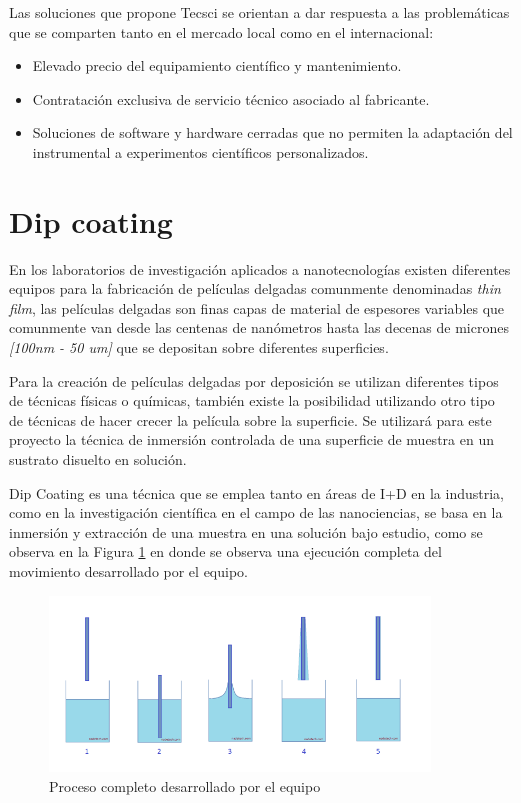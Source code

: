 Las soluciones que propone Tecsci se orientan a dar respuesta a las problemáticas que se comparten tanto en el mercado local como en el internacional:
\begin{itemize}
\item Elevado precio del equipamiento científico y mantenimiento.
\item Contratación exclusiva de servicio técnico asociado al fabricante.
\item Soluciones de software y hardware cerradas que no permiten la adaptación del instrumental a experimentos científicos personalizados.
\end{itemize}


\section{Dip coating}


En los laboratorios de investigación aplicados a nanotecnologías existen diferentes equipos para la fabricación de películas delgadas comunmente denominadas \textit{thin film}, las películas delgadas son finas capas de material de espesores variables que comunmente van desde las centenas de nanómetros hasta las decenas de micrones \textit{[100nm - 50 um]} que se depositan sobre diferentes superficies.  

Para la creación de películas delgadas por deposición se utilizan diferentes tipos de técnicas físicas o químicas, también existe la posibilidad utilizando otro tipo de técnicas de hacer crecer la película sobre la superficie.
Se utilizará para este proyecto la técnica de inmersión controlada de una superficie de muestra en un sustrato disuelto en solución.

Dip Coating es una técnica que se emplea tanto en áreas de I+D en la industria, como en la investigación científica en el campo de las nanociencias, se basa en la inmersión y extracción de una muestra en una solución bajo estudio, como se observa en la Figura \ref{fig:inmersion} en donde se observa una ejecución completa del movimiento desarrollado por el equipo.

\vspace{1cm}
\begin{figure}[htpb]
\centering 
\includegraphics[width=0.9\textwidth]{./Figures/dip-coating.png}
\caption{Proceso completo desarrollado por el equipo}
\label{fig:inmersion}
\end{figure}
\vspace{1cm}
 
